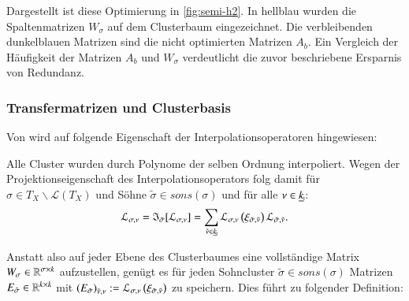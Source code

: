    Dargestellt ist diese Optimierung in \autoref{fig:semi-h2}. In hellblau wurden die Spaltenmatrizen $W_\sigma$ auf dem Clusterbaum eingezeichnet. Die verbleibenden dunkelblauen Matrizen sind
    die nicht optimierten Matrizen $A_b$. Ein Vergleich der Häufigkeit der Matrizen $A_b$ und $W_\sigma$ verdeutlicht die zuvor beschriebene Ersparnis von Redundanz.

    
    \subsubsection{Transfermatrizen und Clusterbasis}
    \label{sec:transmat}
    Von \citet{h2approxint} wird auf folgende Eigenschaft der Interpolationsoperatoren hingewiesen:
    
    

    Alle Cluster wurden durch Polynome der selben Ordnung interpoliert. Wegen der Projektionseigenschaft des Interpolationsoperators folg damit für $\sigma \in T_X \backslash \mathcal{L}\left(T_X\right)$ 
    und Söhne $\tilde \sigma \in sons\left(\sigma\right)$ und für alle $\nu \in \haken{k}$:
    \begin{equation*}
      \lag_\inds{\nu} = \mathfrak{I}_{\tilde \sigma}[\lag_\inds{\nu}] = \sum_{\tilde \nu \in \haken{k}} \lag_\inds{\nu}\left(\xi_{\tilde \sigma,\tilde \nu}\right) \lag_{\tilde \sigma,\tilde \nu}.
    \end{equation*}
    
    Anstatt also auf jeder Ebene des Clusterbaumes eine vollständige Matrix $W_\sigma \in \mathbb{R}^{\sigma \times k}$ aufzustellen, genügt es für jeden Sohncluster $\tilde \sigma \in sons\left(\sigma\right)$
    Matrizen $E_{\tilde \sigma} \in \mathbb{R}^{k \times k}$ mit $\left(E_{\tilde \sigma}\right)_{\tilde\nu , \nu} := \mathcal{L}_{\sigma, \nu}\left(\xi_{\tilde \sigma, \tilde \nu}\right)$ zu speichern. Dies führt zu folgender Definition:
    
